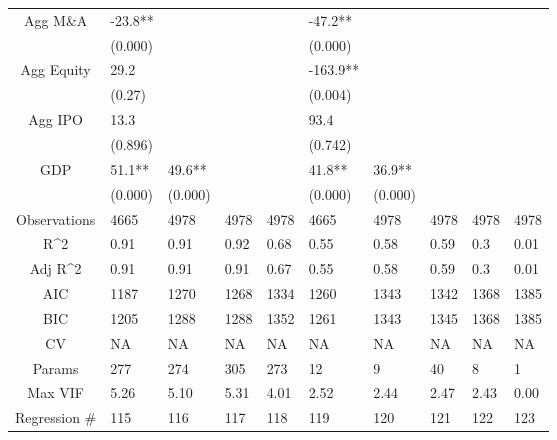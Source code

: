 \documentclass{article}
\begin{document}
\begin{table}[H]
\begin{tabular}{|clllllllll|}
  Agg M\&A & -23.8** &  &  &  & -47.2** &  &  &  &  \\ 
   & (0.000) &  &  &  & (0.000) &  &  &  &  \\ 
  Agg Equity & 29.2 &  &  &  & -163.9** &  &  &  &  \\ 
   & (0.27) &  &  &  & (0.004) &  &  &  &  \\ 
  Agg IPO & 13.3 &  &  &  & 93.4 &  &  &  &  \\ 
   & (0.896) &  &  &  & (0.742) &  &  &  &  \\ 
  GDP & 51.1** & 49.6** &  &  & 41.8** & 36.9** &  &  &  \\ 
   & (0.000) & (0.000) &  &  & (0.000) & (0.000) &  &  &  \\ 
  \hline 
 Observations & 4665 & 4978 & 4978 & 4978 & 4665 & 4978 & 4978 & 4978 & 4978 \\ 
  R^2 & 0.91 & 0.91 & 0.92 & 0.68 & 0.55 & 0.58 & 0.59 & 0.3 & 0.01 \\ 
  Adj R^2 & 0.91 & 0.91 & 0.91 & 0.67 & 0.55 & 0.58 & 0.59 & 0.3 & 0.01 \\ 
  AIC & 1187 & 1270 & 1268 & 1334 & 1260 & 1343 & 1342 & 1368 & 1385 \\ 
  BIC & 1205 & 1288 & 1288 & 1352 & 1261 & 1343 & 1345 & 1368 & 1385 \\ 
  CV & NA & NA & NA & NA & NA & NA & NA & NA & NA \\ 
  Params & 277 & 274 & 305 & 273 & 12 & 9 & 40 & 8 & 1 \\ 
  Max VIF & 5.26 & 5.10 & 5.31 & 4.01 & 2.52 & 2.44 & 2.47 & 2.43 & 0.00 \\ 
  Regression \# & 115 & 116 & 117 & 118 & 119 & 120 & 121 & 122 & 123 \\ 
   \hline
\end{tabular}
 
\end{table}
\end{document}
